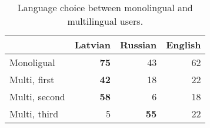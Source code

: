 \begin{table}[h]
  \centering
  \begin{tabular}{lrrr}
    \toprule
     & Latvian & Russian & English \\
    \midrule
    Monoligual     & \textbf{75} & 43 & 62  \\
    \addlinespace
    Multi, first   & \textbf{42} & 18 & 22  \\
    Multi, second  & \textbf{58} &  6 & 18  \\
    Multi, third   & 5  & \textbf{55} & 22  \\
    \bottomrule
  \end{tabular}
  \caption{Language choice between monolingual and multilingual users.}
  \label{tab:language-use}
\end{table}